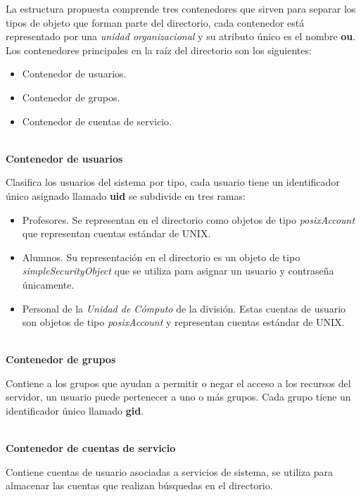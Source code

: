 La estructura propuesta comprende tres contenedores que sirven para separar los tipos de objeto que forman parte del directorio, cada contenedor est\'{a} representado por una \textit{unidad organizacional} y su atributo \'{u}nico es el nombre \textbf{ou}. Los contenedores principales en la ra\'{i}z del directorio son los siguientes:

\begin{itemize}
  \item Contenedor de usuarios.
  \item Contenedor de grupos.
  \item Contenedor de cuentas de servicio.
\end{itemize}

\textbf{\\ Contenedor de usuarios \\}

Clasifica los usuarios del sistema por tipo, cada usuario tiene un identificador \'{u}nico asignado llamado \textbf{uid} se subdivide en tres ramas:

\begin{itemize}
  \item Profesores.
  Se representan en el directorio como objetos de tipo \textit{posixAccount} que representan cuentas est\'{a}ndar de \textsc{UNIX}.
  \item Alumnos.
  Su representaci\'{o}n en el directorio es un objeto de tipo \textit{simpleSecurityObject} que se utiliza para asignar un usuario y contrase\~{n}a \'{u}nicamente.
  \item Personal de la \textit{Unidad de C\'{o}mputo} de la divisi\'{o}n.
  Estas cuentas de usuario son objetos de tipo \textit{posixAccount} y representan cuentas est\'{a}ndar de \textsc{UNIX}.
\end{itemize}

\textbf{\\ Contenedor de grupos \\}

Contiene a los grupos que ayudan a permitir o negar el acceso a los recursos del servidor, un usuario puede pertenecer a uno o m\'{a}s grupos. Cada grupo tiene un identificador \'{u}nico llamado \textbf{gid}.

\textbf{\\ Contenedor de cuentas de servicio \\}

Contiene cuentas de usuario asociadas a servicios de sistema, se utiliza para almacenar las cuentas que realizan b\'{u}squedas en el directorio.

